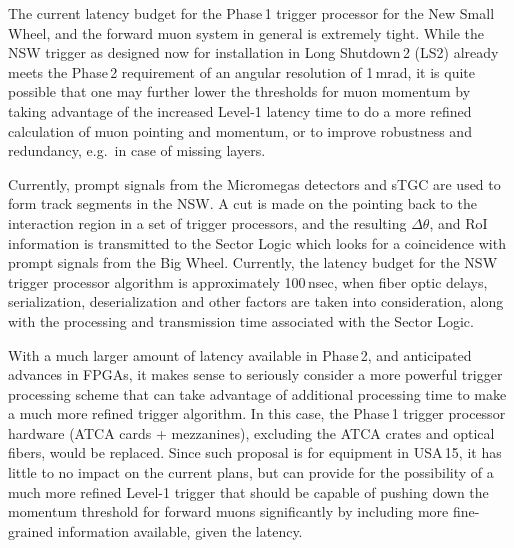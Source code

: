 The current latency budget for the Phase\,1 trigger processor for the
New Small Wheel, and the forward muon system in general is extremely
tight.
While the NSW trigger as designed now for installation in Long Shutdown\,2 (LS2)
already meets the Phase\,2 requirement of an angular resolution of 1\,mrad,
it is quite possible that one may further lower the thresholds
for muon momentum by taking advantage of the increased Level-1 latency time
to do a more refined calculation of muon pointing and momentum, or to
improve robustness and redundancy, e.g.\ in case of missing layers.

Currently, prompt signals from the Micromegas detectors and sTGC are
used to form track segments in the NSW. A cut is made on the pointing
back to the interaction region in a set of trigger processors, and the
resulting $\Delta\theta$, and RoI information is transmitted to the Sector Logic
which looks for a coincidence with prompt signals from the Big Wheel.
Currently, the latency budget for the NSW trigger processor algorithm
is approximately 100\,nsec, when fiber optic delays, serialization,
deserialization and other factors are taken into consideration, along
with the processing and transmission time associated with the Sector
Logic.

With a much larger amount of latency available in Phase\,2, and
anticipated advances in FPGAs, it makes sense to seriously consider a
more powerful trigger processing scheme that can take advantage of
additional processing time to make a much more refined trigger
algorithm. In this case, the Phase\,1 trigger processor hardware (ATCA cards + mezzanines),
excluding the ATCA crates and optical fibers, would be replaced.
Since such proposal is for equipment in USA\,15, it has
little to no impact on the current plans, but can provide for the
possibility of a much more refined Level-1 trigger that should be capable
of pushing down the momentum threshold for forward muons significantly
by including more fine-grained information available, given the
latency.